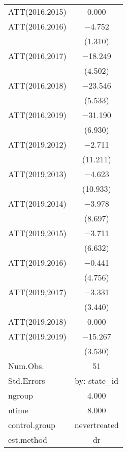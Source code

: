 \begin{table}
\begin{tabular}[t]{lc}
ATT(2016,2015) & \num{0.000}\\
ATT(2016,2016) & \num{-4.752}\\
 & (\num{1.310})\\
ATT(2016,2017) & \num{-18.249}\\
 & (\num{4.502})\\
ATT(2016,2018) & \num{-23.546}\\
 & (\num{5.533})\\
ATT(2016,2019) & \num{-31.190}\\
 & (\num{6.930})\\
ATT(2019,2012) & \num{-2.711}\\
 & (\num{11.211})\\
ATT(2019,2013) & \num{-4.623}\\
 & (\num{10.933})\\
ATT(2019,2014) & \num{-3.978}\\
 & (\num{8.697})\\
ATT(2019,2015) & \num{-3.711}\\
 & (\num{6.632})\\
ATT(2019,2016) & \num{-0.441}\\
 & (\num{4.756})\\
ATT(2019,2017) & \num{-3.331}\\
 & (\num{3.440})\\
ATT(2019,2018) & \num{0.000}\\
ATT(2019,2019) & \num{-15.267}\\
 & (\num{3.530})\\
\midrule
Num.Obs. & \num{51}\\
Std.Errors & by: state\_id\\
ngroup & \num{4.000}\\
ntime & \num{8.000}\\
control.group & nevertreated\\
est.method & dr\\
\bottomrule
\end{tabular}
\end{table}
